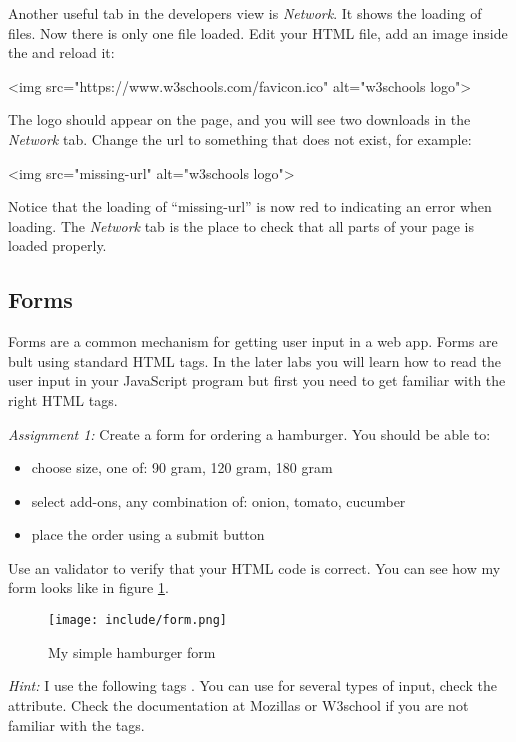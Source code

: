 \documentclass[fleqn, article, a4paper]{memoir}
\begin{document}
Another useful tab in the developers view is \emph{Network}. It shows the loading of files. Now there is only one file loaded. Edit your HTML file, add an image inside the  and reload it:
\begin{Code}
<img src="https://www.w3schools.com/favicon.ico" alt="w3schools logo">
\end{Code}
The logo should appear on the page, and you will see two downloads in the \emph{Network} tab. Change the url to something that does not exist, for example:
\begin{Code}
<img src="missing-url" alt="w3schools logo">
\end{Code}
Notice that the loading of ``missing-url'' is now red to indicating an error when loading. The \emph{Network} tab is the place to check that all parts of your page is loaded properly.

\subsection*{Forms}
Forms are a common mechanism for getting user input in a web app. Forms are bult using standard HTML tags. In the later labs you will learn how to read the user input in your JavaScript program but first you need to get familiar with the right HTML tags.

\medskip
\noindent \emph{Assignment 1:} Create a form for ordering a hamburger. You should be able to:
\begin{itemize}
\item choose size, one of: 90 gram, 120 gram, 180 gram
\item select add-ons, any combination of: onion, tomato, cucumber
\item place the order using a submit button
\end{itemize}
Use an validator to verify that your HTML code is correct. You can see how my form looks like in figure \ref{fig:form}.

\begin{figure}[h]
\caption{My simple hamburger form}
\label{fig:form}
\centering
\texttt{[image: include/form.png]}
\end{figure}

\emph{Hint:} I use the following tags . You can use  for several types of input, check the  attribute. Check the documentation at Mozillas or W3school if you are not familiar with the tags.
\end{document}
